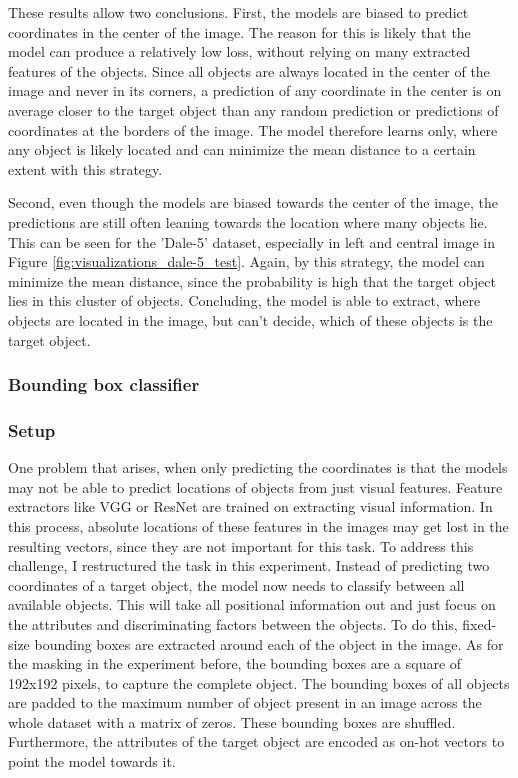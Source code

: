 These results allow two conclusions.
First, the models are biased to predict coordinates in the center of the image.
The reason for this is likely that the model can produce a relatively low loss, without relying on many extracted features of the objects.
Since all objects are always located in the center of the image and never in its corners, a prediction of any coordinate in the center is on average closer to the target object than any random prediction or predictions of coordinates at the borders of the image.
The model therefore learns only, where any object is likely located and can minimize the mean distance to a certain extent with this strategy.

Second, even though the models are biased towards the center of the image, the predictions are still often leaning towards the location where many objects lie.
This can be seen for the 'Dale-5' dataset, especially in left and central image in Figure \ref{fig:visualizations_dale-5_test}.
Again, by this strategy, the model can minimize the mean distance, since the probability is high that the target object lies in this cluster of objects.
Concluding, the model is able to extract, where objects are located in the image, but can't decide, which of these objects is the target object.

\subsubsection{Bounding box classifier}
\subsubsection*{Setup}

One problem that arises, when only predicting the coordinates is that the models may not be able to predict locations of objects from just visual features.
Feature extractors like VGG or ResNet are trained on extracting visual information.
In this process, absolute locations of these features in the images may get lost in the resulting vectors, since they are not important for this task.
To address this challenge, I restructured the task in this experiment.
Instead of predicting two coordinates of a target object, the model now needs to classify between all available objects.
This will take all positional information out and just focus on the attributes and discriminating factors between the objects.
To do this, fixed-size bounding boxes are extracted around each of the object in the image.
As for the masking in the experiment before, the bounding boxes are a square of 192x192 pixels, to capture the complete object. 
The bounding boxes of all objects are padded to the maximum number of object present in an image across the whole dataset with a matrix of zeros.
These bounding boxes are shuffled.
Furthermore, the attributes of the target object are encoded as on-hot vectors to point the model towards it.

